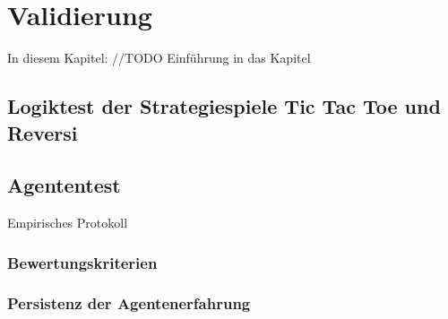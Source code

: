 \chapter{Validierung}
\label{cha:validierung}

In diesem Kapitel: //TODO Einführung in das Kapitel

\section{Logiktest der Strategiespiele Tic Tac Toe und Reversi}

\section{Agententest}
Empirisches Protokoll

\subsection{Bewertungskriterien}

\subsection{Persistenz der Agentenerfahrung}

